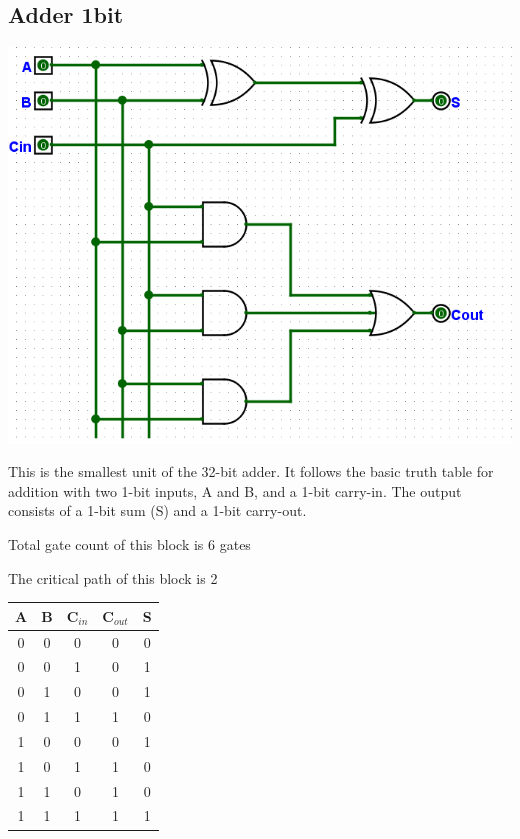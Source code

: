 \documentclass{article}
\begin{document}
\subsection{Adder 1bit}
\begin{center}
    \includegraphics[width=1\textwidth]{images/Add1.png}
\end{center}
\hspace*{2em}This is the smallest unit of the 32-bit adder. It follows the basic truth table for addition with two 1-bit inputs, A and B, and a 1-bit carry-in. The output consists of a 1-bit sum (S) and a 1-bit carry-out.

\hspace*{2em}Total gate count of this block is 6 gates

\hspace{2em}The critical path of this block is 2
\begin{center}
\renewcommand{\arraystretch}{1.5} %
\begin{tabular}{|c|c|c|c|c|}
\hline
\textbf{A} & \textbf{B} & \textbf{C$_{in}$} & \textbf{C$_{out}$} & \textbf{S} \\
\hline
0 & 0 & 0 & 0 & 0 \\
\hline
0 & 0 & 1 & 0 & 1 \\
\hline
0 & 1 & 0 & 0 & 1 \\
\hline
0 & 1 & 1 & 1 & 0 \\
\hline
1 & 0 & 0 & 0 & 1 \\
\hline
1 & 0 & 1 & 1 & 0 \\
\hline
1 & 1 & 0 & 1 & 0 \\
\hline
1 & 1 & 1 & 1 & 1 \\
\hline
\end{tabular}   

\end{center}
\end{document}
